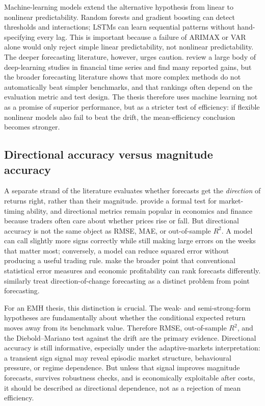 \documentclass[12pt, a4paper]{article}
\begin{document}
Machine-learning models extend the alternative hypothesis from linear to nonlinear
predictability. Random forests and gradient boosting can detect thresholds and interactions;
LSTMs can learn sequential patterns without hand-specifying every lag. This is important
because a failure of ARIMAX or VAR alone would only reject simple linear predictability, not
nonlinear predictability. The deeper forecasting literature, however, urges caution.
\textcite{sezer2020} review a large body of deep-learning studies in financial time series
and find many reported gains, but the broader forecasting literature shows that more complex
methods do not automatically beat simpler benchmarks, and that rankings often depend on the
evaluation metric and test design. The thesis therefore uses machine learning not as a
promise of superior performance, but as a stricter test of efficiency: if flexible nonlinear
models also fail to beat the drift, the mean-efficiency conclusion becomes stronger.

\subsection{Directional accuracy versus magnitude accuracy}

A separate strand of the literature evaluates whether forecasts get the \emph{direction} of
returns right, rather than their magnitude. \textcite{pesaran1992} provide a formal test for
market-timing ability, and directional metrics remain popular in economics and finance
because traders often care about whether prices rise or fall. But directional accuracy is
not the same object as RMSE, MAE, or out-of-sample \(R^2\). A model can call slightly more
signs correctly while still making large errors on the weeks that matter most; conversely, a
model can reduce squared error without producing a useful trading rule. \textcite{leitch1991}
make the broader point that conventional statistical error measures and economic
profitability can rank forecasts differently. \textcite{christoffersen2006} similarly treat
direction-of-change forecasting as a distinct problem from point forecasting.

For an EMH thesis, this distinction is crucial. The weak- and semi-strong-form hypotheses
are fundamentally about whether the conditional expected return moves away from its benchmark
value. Therefore RMSE, out-of-sample \(R^2\), and the Diebold--Mariano test against the
drift are the primary evidence. Directional accuracy is still informative, especially under
the adaptive-markets interpretation: a transient sign signal may reveal episodic market
structure, behavioural pressure, or regime dependence. But unless that signal improves
magnitude forecasts, survives robustness checks, and is economically exploitable after
costs, it should be described as directional dependence, not as a rejection of mean
efficiency.
\end{document}
